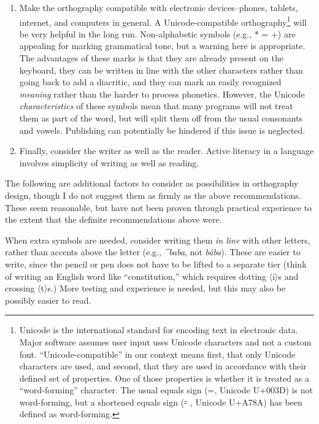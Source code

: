 \documentclass[output=paper]{langscibook}
\begin{document}
\begin{enumerate}
\item Make the orthography compatible with electronic devices–phones, tablets, internet, and computers in general. A Unicode-compatible orthography\footnote{Unicode is the international standard for encoding text in electronic data. Major software assumes user input uses Unicode characters and not a custom font. “Unicode-compatible” in our context means first, that only Unicode characters are used, and second, that they are used in accordance with their defined set of properties. One of those properties is whether it is treated as a “word-forming” character. The usual equals sign (=, Unicode U+003D) is not word-forming, but a shortened equals sign (꞊ , Unicode U+A78A) has been defined as word-forming.}  will be very helpful in the long run. Non-alphabetic symbols (e.g., * = +) are appealing for marking grammatical tone, but a warning here is appropriate. The advantages of these marks is that they are already present on the keyboard, they can be written in line with the other characters rather than going back to add a diacritic, and they can mark an easily recognized \textit{meaning} rather than the harder to process phonetics. However, the Unicode \textit{characteristics} of these symbols mean that many programs will not treat them as part of the word, but will split them off from the usual consonants and vowels. Publishing can potentially be hindered if this issue is neglected.

\item Finally, consider the writer as well as the reader. Active literacy in a language involves simplicity of writing as well as reading.

\end{enumerate}
The following are additional factors to consider as possibilities in orthography design, though I do not suggest them as firmly as the above recommendations. These seem reasonable, but have not been proven through practical experience to the extent that the definite recommendations above were.

When extra symbols are needed, consider writing them \textit{in line} with other letters, rather than accents above the letter (e.g., \textit{\^{}}\textit{baba}, not \textit{bába}). These are easier to write, since the pencil or pen does not have to be lifted to a separate tier (think of writing an English word like “constitution,” which requires dotting 〈i〉s and crossing 〈t〉s.) More testing and experience is needed, but this may also be possibly easier to read.
\end{document}
